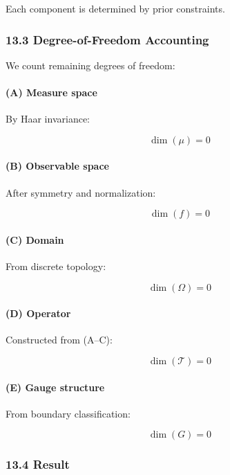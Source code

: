 \documentclass[
]{article}
\begin{document}
Each component is determined by prior constraints.

\subsubsection{13.3 Degree-of-Freedom
Accounting}\label{degree-of-freedom-accounting}

We count remaining degrees of freedom:

\paragraph{(A) Measure space}\label{a-measure-space}

By Haar invariance:

\[
\dim(\mu) = 0
\]

\paragraph{(B) Observable space}\label{b-observable-space}

After symmetry and normalization:

\[
\dim(f) = 0
\]

\paragraph{(C) Domain}\label{c-domain}

From discrete topology:

\[
\dim(\Omega) = 0
\]

\paragraph{(D) Operator}\label{d-operator}

Constructed from (A--C):

\[
\dim(\mathcal{T}) = 0
\]

\paragraph{(E) Gauge structure}\label{e-gauge-structure}

From boundary classification:

\[
\dim(G) = 0
\]

\subsubsection{13.4 Result}\label{result-2}
\end{document}

